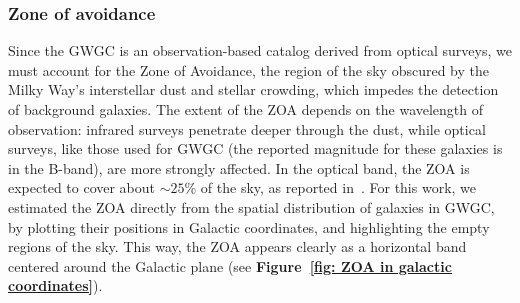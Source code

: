 \subsubsection{Zone of avoidance}
Since the GWGC is an observation-based catalog derived from optical surveys, we must account for the Zone of Avoidance, the region of the sky obscured by the Milky Way’s interstellar dust and stellar crowding, which impedes the detection of background galaxies.
The extent of the ZOA depends on the wavelength of observation: infrared surveys penetrate deeper through the dust, while optical surveys, like those used for GWGC (the reported magnitude for these galaxies is in the B-band), are more strongly affected. 
In the optical band, the ZOA is expected to cover about $\sim25\%$ of the sky, as reported in~\cite{Kraan-Korteweg}.
For this work, we estimated the ZOA directly from the spatial distribution of galaxies in GWGC, by plotting their positions in Galactic coordinates, and highlighting the empty regions of the sky. 
This way, the ZOA appears clearly as a horizontal band centered around the Galactic plane (see \textbf{Figure~\ref{fig: ZOA in galactic coordinates}}).
